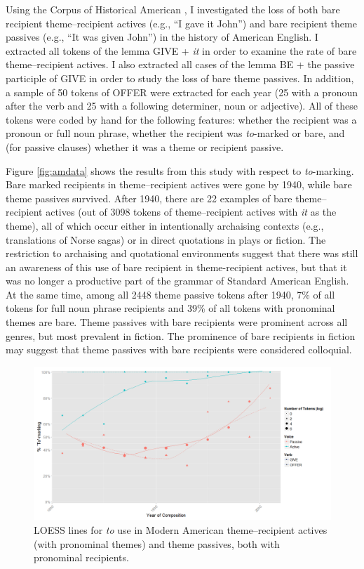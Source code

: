 Using the Corpus of Historical American \citep{Davies.2010}, I investigated the loss of both bare recipient theme--recipient actives (e.g., ``I gave it John'') and bare recipient theme passives (e.g., ``It was given John'') in the history of American English. I extracted all tokens of the lemma GIVE + \textit{it} in order to examine the rate of bare theme--recipient actives. I also extracted all cases of the lemma BE + the passive participle of GIVE in order to study the loss of bare theme passives. In addition, a sample of 50 tokens of OFFER were extracted for each year (25 with a pronoun after the verb and 25 with a following determiner, noun or adjective). All of these tokens were coded by hand for the following features: whether the recipient was a pronoun or full noun phrase, whether the recipient was \textit{to}-marked or bare, and (for passive clauses) whether it was a theme or recipient passive.

Figure \ref{fig:amdata} shows the results from this study with respect to \textit{to}-marking. Bare marked recipients in theme--recipient actives were gone by 1940, while bare theme passives survived. After 1940, there are 22 examples of bare theme--recipient actives (out of 3098 tokens of theme--recipient actives with \textit{it} as the theme), all of which occur either in intentionally archaising contexts (e.g., translations of Norse sagas) or in direct quotations in plays or fiction. The restriction to archaising and quotational environments suggest that there was still an awareness of this use of bare recipient in theme-recipient actives, but that it was no longer a productive part of the grammar of Standard American English. At the same time, among all 2448 theme passive tokens after 1940, 7\% of all tokens for full noun phrase recipients and 39\% of all tokens with pronominal themes are bare. Theme passives with bare recipients were prominent across all genres, but most prevalent in fiction. The prominence of bare recipients in fiction may suggest that theme passives with bare recipients were considered colloquial.

\begin{figure}[ht!]

{\centering \includegraphics[width=\linewidth]{../images/recpro_to_am} 

}

\caption{LOESS lines for \textit{to} use in Modern American theme--recipient actives (with pronominal themes) and theme passives, both with pronominal recipients.\label{fig:amdata}}\label{fig:amtoset-graph}
\end{figure}

